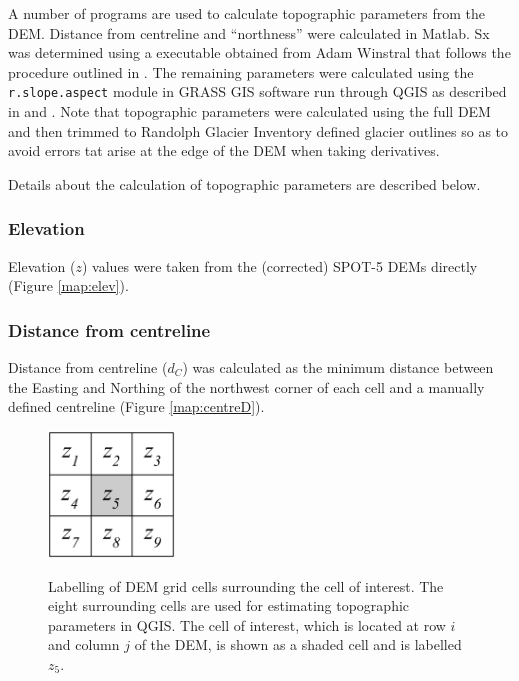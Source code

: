 \documentclass[12pt]{article}
\begin{document}
A number of programs are used to calculate topographic parameters from the DEM. Distance from centreline and ``northness'' were calculated in Matlab. Sx was determined using a executable obtained from Adam Winstral that follows the procedure outlined in \cite{Winstral2002}. The remaining parameters were calculated using the \texttt{r.slope.aspect} module in GRASS GIS software run through QGIS as described in \cite{Mitavsova1993} and \cite{Hofierka2009}. Note that topographic parameters were calculated using the full DEM and then trimmed to Randolph Glacier Inventory defined glacier outlines so as to avoid errors tat arise at the edge of the DEM when taking derivatives. 

Details about the calculation of topographic parameters are described below.
\subsubsection*{Elevation}

Elevation ($z$) values were taken from the (corrected) SPOT-5 DEMs directly (Figure \ref{map:elev}).

\subsubsection*{Distance from centreline}

Distance from centreline ($d_C$) was calculated as the minimum distance between the Easting and Northing of the northwest corner of each cell and a manually defined centreline (Figure \ref{map:centreD}). 


\begin{figure}
	\centering
	\includegraphics[width = 0.3\textwidth]{DEMGrid.png}\\
	\caption{Labelling of DEM grid cells surrounding the cell of interest. The eight surrounding cells are used for estimating topographic parameters in QGIS. The cell of interest, which is located at row $i$ and column $j$ of the DEM, is shown as a shaded cell and is labelled $z_5$.}
	\label{fig:DEMgrid}
\end{figure}
\end{document}
